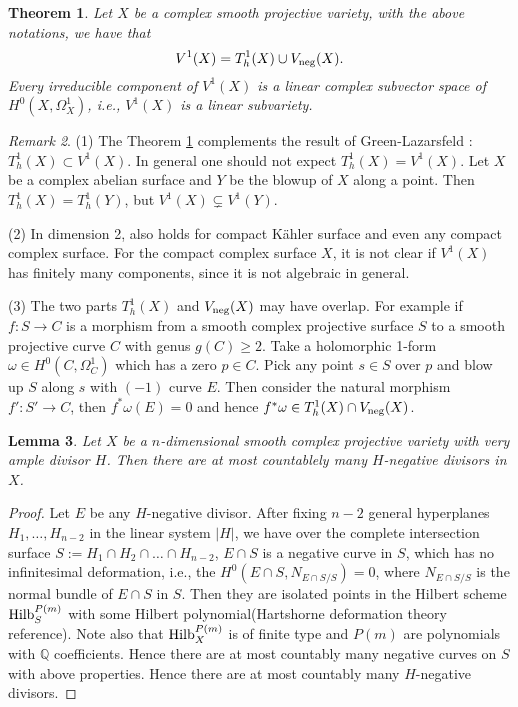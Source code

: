 \documentclass[a4paper,12pt,reqno]{amsart}
\newtheorem{theorem}{Theorem}[section]
\theoremstyle{plain}
\newtheorem{lemma}[theorem]{Lemma}
\theoremstyle{remark}
\newtheorem{remark}[theorem]{Remark}
\newcommand{\Q}{\mathbb Q}
\begin{document}
\begin{theorem}\label{Thm:Proj-codim1}
 Let $X$ be a complex smooth projective variety, with the above notations, we have that 
$$V^1(X)= T_h^1(X)\cup V_{\textnormal{neg}}(X).
$$
Every irreducible component of $V^1(X)$ is a linear complex subvector space of $H^0(X, \Omega_X^1)$, i.e., $V^1(X)$ is a linear subvariety. %
\end{theorem}

\begin{remark} (1) The Theorem \ref{Thm:Proj-codim1} complements the result of Green-Lazarsfeld \cite{GL87}: $T_h^1(X) \subset V^1(X)$. In general one should not expect $T_h^1(X) = V^1(X)$. Let $X$ be a complex abelian surface and $Y$ be the blowup of $X$ along a point. Then $T_h^1(X)=T_h^1(Y)$, but  $V^1(X)\subsetneq V^1(Y)$.

(2) In dimension 2, \cite[Theorem 2]{Sp88} also holds for compact K\"ahler surface and even any compact complex surface. For the compact complex surface $X$, it is not clear if $V^1(X)$ has finitely many components, since it is not algebraic in general.

(3) The two parts $T_h^1(X)$ and $V_{\textnormal{neg}}(X)$ may have overlap. For example if $f: S\to C$ is a morphism from a smooth complex projective surface $S$ to a smooth projective curve $C$ with genus $g(C)\geq2$. Take a holomorphic 1-form $\omega\in H^0(C, \Omega_C^1)$ which has a zero $p\in C$. Pick any point $s\in S$ over $p$ and blow up $S$ along $s$ with $(-1)$ curve $E$. Then consider the natural morphism $f': S'\to C$, then $f^*\omega(E)=0$ and hence $f^*\omega\in T_h^1(X)\cap V_{\textnormal{neg}}(X)$.
\end{remark}

\begin{lemma} \label{countable} Let $X$ be a $n$-dimensional smooth complex projective variety with very ample divisor $H$. Then there are at most countablely many $H$-negative divisors in $X$.
\end{lemma}

\begin{proof}
Let $E$ be any $H$-negative divisor. After fixing $n-2$ general hyperplanes $H_1, \ldots, H_{n-2}$ in the linear system $|H|$, we have over the complete intersection surface $S:=H_1\cap H_2\cap\ldots\cap H_{n-2}$, $E\cap S$ is a negative curve in $S$, which has no infinitesimal deformation, i.e., the $H^0(E\cap S, N_{E\cap S/S})=0$, where $N_{E\cap S/S}$ is the normal bundle of $E\cap S$ in $S$. Then they are isolated points in the Hilbert scheme $\textnormal{Hilb}_S^{P(m)}$ with some Hilbert polynomial{\color{red}(Hartshorne deformation theory reference)}. Note also that $\textnormal{Hilb}_X^{P(m)}$ is of finite type and $P(m)$ are polynomials with $\Q$ coefficients. Hence there are at most countably many negative curves on $S$ with above properties. Hence there are at most countably many $H$-negative divisors.
\end{proof}
\end{document}
